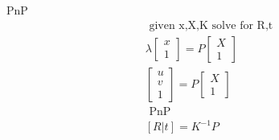 \documentclass[8pt, english]{article}
\begin{document}
\begin{multicols}{4}
PnP
\begin{align*}
\text{ given x,X,K solve for R,t} \\
\lambda \begin{bmatrix}
x\\1 
\end{bmatrix} = P \begin{bmatrix}
X \\1
\end{bmatrix}\\
\begin{bmatrix}
u\\ v \\1 
\end{bmatrix} = P \begin{bmatrix}
X \\1 
\end{bmatrix}\\
\text{ PnP} \\ 
[ R |t ] = K^{-1} P 
\end{align*}  

\end{multicols}
\end{document}
